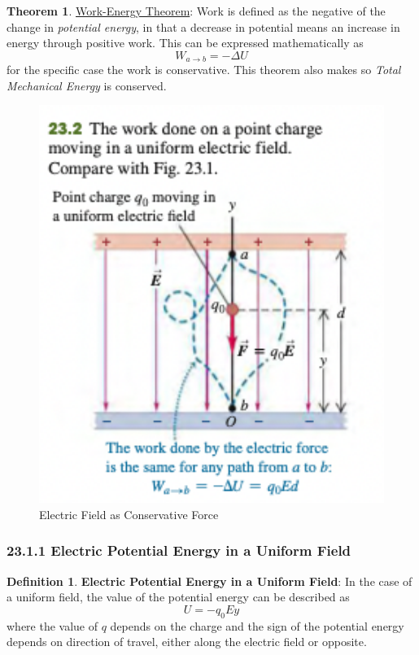 \documentclass[12pt]{amsart}
\theoremstyle{definition}
\newtheorem{theorem}{Theorem}  %
\newtheorem{definition}{Definition} %
\numberwithin{equation}{theorem}    %
\begin{document}
\begin{theorem}
    \underline{Work-Energy Theorem}: Work is defined as the negative of the
    change in \textit{potential energy}, in that a decrease in potential means an increase
    in energy through positive work. This can be expressed mathematically as 
    $$W_{a \rightarrow b} = -\Delta U$$ for the specific case the work is 
    conservative. This theorem also makes so \textit{Total Mechanical Energy} is conserved.
\end{theorem}

\begin{figure}[H]
    \centering
    \includegraphics[width=5in]{Media/Conservative.png}
    \caption{Electric Field as Conservative Force}
    \label{Electric Field as Conservative Force}
\end{figure}


\subsubsection*{23.1.1 Electric Potential Energy in a Uniform Field}

\begin{definition}
    \textbf{Electric Potential Energy in a Uniform Field}:
    In the case of a uniform field, the value of the potential energy 
    can be described as $$U = -q_0 Ey$$ where the value of $q$ depends on the charge
    and the sign of the potential energy depends on direction of travel, either
    along the electric field or opposite.
\end{definition}
\end{document}
